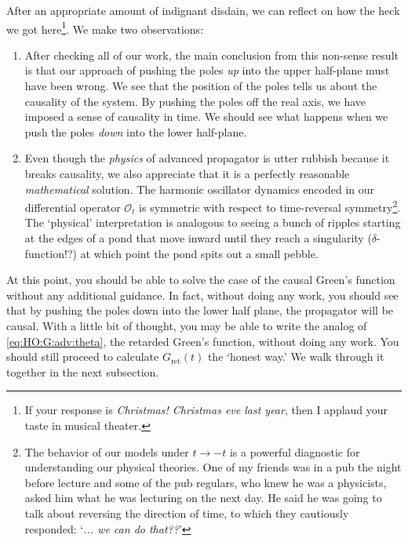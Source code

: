 After an appropriate amount of indignant disdain, we can reflect on how the heck we got here\footnote{If your response is \emph{Christmas! Christmas eve last year}, then I applaud your taste in musical theater.}. We make two observations:
\begin{enumerate}
\item After checking all of our work, the main conclusion from this non-sense result is that our approach of pushing the poles \emph{up} into the upper half-plane must have been wrong. We see that the position of the poles tells us about the causality of the system. By pushing the poles off the real axis, we have imposed a sense of causality in time. We should see what happens when we push the poles \emph{down} into the lower half-plane. 

\item Even though the \emph{physics} of advanced propagator is utter rubbish because it breaks causality, we also appreciate that it is a perfectly reasonable \emph{mathematical} solution. The harmonic oscillator dynamics encoded in our differential operator $\mathcal O_t$ is symmetric with respect to time-reversal symmetry\footnote{The behavior of our models under $t\to -t$ is a powerful diagnostic for understanding our physical theories. One of my friends was in a pub the night before lecture and some of the pub regulars, who knew he was a physicists, asked him what he was lecturing on the next day. He said he was going to talk about reversing the direction of time, to which they cautiously responded: `\emph{... we can do that??}'}. The `physical' interpretation is analogous to seeing a bunch of ripples starting at the edges of a pond that move inward until they reach a singularity ($\delta$-function!?) at which point the pond spits out a small pebble. 
\end{enumerate}


\begin{exercise}
At this point, you should be able to solve the case of the causal Green's function without any additional guidance. In fact, without doing any work, you should see that by pushing the poles down into the lower half plane, the propagator will be causal. With a little bit of thought, you may be able to write the analog of \eqref{eq:HO:G:adv:theta}, the retarded Green's function,
without doing any work. You should still proceed to calculate $G_\text{ret}(t)$ the `honest way.' We walk  through it together in the next subsection. 
\label{ex:retarded:G:HO}
\end{exercise}

